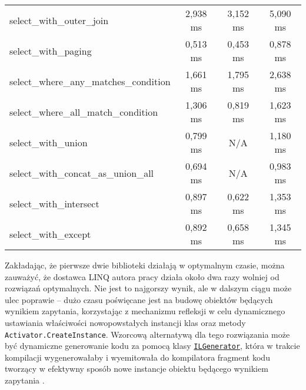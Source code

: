 \begin{table}[h]
\begin{tabular}{l|ccc}
select\_with\_outer\_join              & 2,938 ms             & 3,152 ms         & 5,090 ms              \\
select\_with\_paging                   & 0,513 ms             & 0,453 ms         & 0,878 ms              \\
select\_where\_any\_matches\_condition & 1,661 ms             & 1,795 ms         & 2,638 ms              \\
select\_where\_all\_match\_condition   & 1,306 ms             & 0,819 ms         & 1,623 ms              \\
select\_with\_union                    & 0,799 ms             & N/A              & 1,180 ms              \\
select\_with\_concat\_as\_union\_all   & 0,694 ms             & N/A              & 0,983 ms              \\
select\_with\_intersect                & 0,897 ms             & 0,622 ms         & 1,353 ms              \\
select\_with\_except                   & 0,892 ms             & 0,658 ms         & 1,345 ms  
\end{tabular}
\end{table}

\pagebreak

Zakładając, że pierwsze dwie biblioteki działają w optymalnym czasie, można zauważyć, że dostawca LINQ autora pracy działa około dwa razy wolniej od rozwiązań optymalnych. Nie jest to najgorszy wynik, ale w dalszym ciągu może ulec poprawie – dużo czasu poświęcane jest na budowę obiektów będących wynikiem zapytania, korzystając z mechanizmu refleksji w celu dynamicznego ustawiania właściwości nowopowstałych instancji klas oraz metody \texttt{Activator.CreateInstance}. Wzorcową alternatywą dla tego rozwiązania może być dynamiczne generowanie kodu za pomocą klasy \href{https://msdn.microsoft.com/pl-pl/library/system.reflection.emit.ilgenerator(v=vs.110).aspx}{\texttt{ILGenerator}}, która w trakcie kompilacji wygenerowałaby i wyemitowała do kompilatora fragment kodu tworzący w efektywny sposób nowe instancje obiektu będącego wynikiem zapytania \cite{il_generator}.